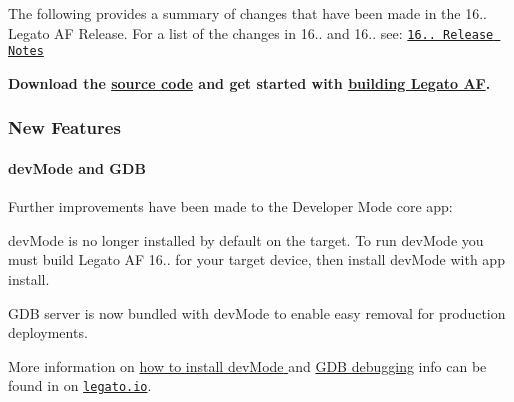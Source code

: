 The following provides a summary of changes that have been made in the 16.. Legato AF Release. For a list of the changes in 16.. and 16.. see\+: \href{https://docs.legato.io/16_10/Legato_16_10_1_ReleaseNotes.pdf}{\tt 16.. Release Notes}

{\bfseries  Download the \hyperlink{aboutReleaseInfo}{source code} and get started with \hyperlink{basicBuild}{building Legato AF}. }\hypertarget{releaseNotes16103_rn16_10_3_Features}{}\subsubsection{New Features}\label{releaseNotes16103_rn16_10_3_Features}
\hypertarget{releaseNotes16103_rn16_10_3_devModeGDB}{}\paragraph{dev\+Mode and G\+DB}\label{releaseNotes16103_rn16_10_3_devModeGDB}
Further improvements have been made to the Developer Mode core app\+:
\begin{DoxyItemize}
\item {\ttfamily dev\+Mode} is no longer installed by default on the target. To run {\ttfamily dev\+Mode} you must build Legato AF 16.. for your target device, then install {\ttfamily dev\+Mode} with {\ttfamily app} {\ttfamily install}.
\item G\+DB server is now bundled with {\ttfamily dev\+Mode} to enable easy removal for production deployments.
\end{DoxyItemize}

More information on \hyperlink{basicTargetDevMode}{how to install {\ttfamily dev\+Mode} }and \hyperlink{howToDebugGDB}{G\+DB debugging} info can be found in on \href{https://legato.io}{\tt legato.\+io}.

